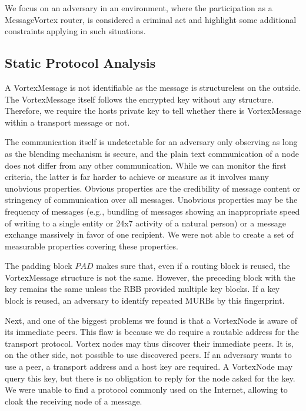 \documentclass[10pt,journal,compsoc,twocolumn,twoside]{IEEEtran}
\begin{document}
We focus on an adversary in an environment, where the participation as a MessageVortex router, is considered a criminal act and highlight some additional constraints applying in such situations.

\subsection{Static Protocol Analysis\label{sec:staticAnalysis}}
A VortexMessage is not identifiable as the message is structureless on the outside. The VortexMessage itself follows the encrypted key without any structure. Therefore, we require the hosts private key to tell whether there is VortexMessage within a transport message or not.

The communication itself is undetectable for an adversary only observing as long as the blending mechanism is secure, and the plain text communication of a node does not differ from any other communication. While we can monitor the first criteria, the latter is far harder to achieve or measure as it involves many unobvious properties. Obvious properties are the credibility of message content or stringency of communication over all messages. Unobvious properties may be the frequency of messages (e.g., bundling of messages showing an inappropriate speed of writing to a single entity or 24x7 activity of a natural person) or a message exchange massively in favor of one recipient. We were not able to create a set of measurable properties covering these properties.

The padding block $PAD$ makes sure that, even if a routing block is reused, the VortexMessage structure is not the same. However, the preceding block with the key remains the same unless the RBB provided multiple key blocks. If a key block is reused, an adversary to identify repeated MURBs by this fingerprint.


Next, and one of the biggest problems we found is that a VortexNode is aware of its immediate peers. This flaw is because we do require a routable address for the transport protocol. Vortex nodes may thus discover their immediate peers. It is, on the other side, not possible to use discovered peers. If an adversary wants to use a peer, a transport address and a host key are required. A VortexNode may query this key, but there is no obligation to reply for the node asked for the key. We were unable to find a protocol commonly used on the Internet, allowing to cloak the receiving node of a message.
\end{document}
